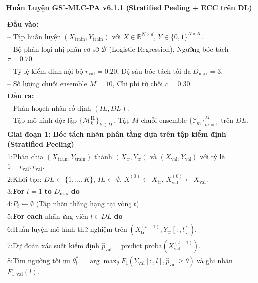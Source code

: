 \documentclass[11pt,a4paper]{article}
\begin{document}
\begin{table}[H]
\centering
\small
\caption{\textbf{Huấn Luyện GSI-MLC-PA v6.1.1 (Stratified Peeling + ECC trên DL)}}\label{alg:v611_training}
\begin{tabular}{p{}}
\toprule
\textbf{Đầu vào:} \\
\quad -- Tập huấn luyện $(X_{\text{train}}, Y_{\text{train}})$ với $X \in \mathbb{R}^{N \times d}$, $Y \in \{0, 1\}^{N \times K}$. \\
\quad -- Bộ phân loại nhị phân cơ sở $\mathcal{B}$ (Logistic Regression), Ngưỡng bóc tách $\tau = 0.70$. \\
\quad -- Tỷ lệ kiểm định nội bộ $r_{\text{val}} = 0.20$, Độ sâu bóc tách tối đa $D_{\max} = 3$. \\
\quad -- Số lượng chuỗi ensemble $M = 10$, Chi phí từ chối $c = 0.30$. \\
\textbf{Đầu ra:} \\
\quad -- Phân hoạch nhãn cố định $(IL, DL)$. \\
\quad -- Tập mô hình độc lập $\{\mathcal{M}_k^{\text{IL}}\}_{k \in IL}$, Tập $M$ chuỗi ensemble $\{\mathcal{C}_m\}_{m=1}^M$ trên $DL$. \\
\midrule
\textbf{Giai đoạn 1: Bóc tách nhãn phân tầng dựa trên tập kiểm định (Stratified Peeling)} \\
1:\quad Phân chia $(X_{\text{train}}, Y_{\text{train}})$ thành $(X_{\text{tr}}, Y_{\text{tr}})$ và $(X_{\text{val}}, Y_{\text{val}})$ với tỷ lệ $1 - r_{\text{val}} : r_{\text{val}}$. \\
2:\quad Khởi tạo: $DL \leftarrow \{1, \dots, K\}$, $IL \leftarrow \emptyset$, $X_{\text{tr}}^{(0)} \leftarrow X_{\text{tr}}$, $X_{\text{val}}^{(0)} \leftarrow X_{\text{val}}$. \\
3:\quad \textbf{For} $t = 1$ \textbf{to} $D_{\max}$ \textbf{do} \\
4:\quad\quad $P_t \leftarrow \emptyset$ \quad (Tập nhãn thăng hạng tại vòng $t$) \\
5:\quad\quad \textbf{For each} nhãn ứng viên $l \in DL$ \textbf{do} \\
6:\quad\quad\quad Huấn luyện mô hình thử nghiệm trên $(X_{\text{tr}}^{(t-1)}, Y_{\text{tr}}[:, l])$. \\
7:\quad\quad\quad Dự đoán xác suất kiểm định $\hat{p}_{\text{val}} = \text{predict\_proba}(X_{\text{val}}^{(t-1)})$. \\
8:\quad\quad\quad Tìm ngưỡng tối ưu $\theta_l^* = \arg\max_{\theta} F_1(Y_{\text{val}}[:, l], \hat{p}_{\text{val}} \ge \theta)$ và ghi nhận $F_{1, \text{val}}(l)$. \\

\end{tabular}
\end{table}
\end{document}
